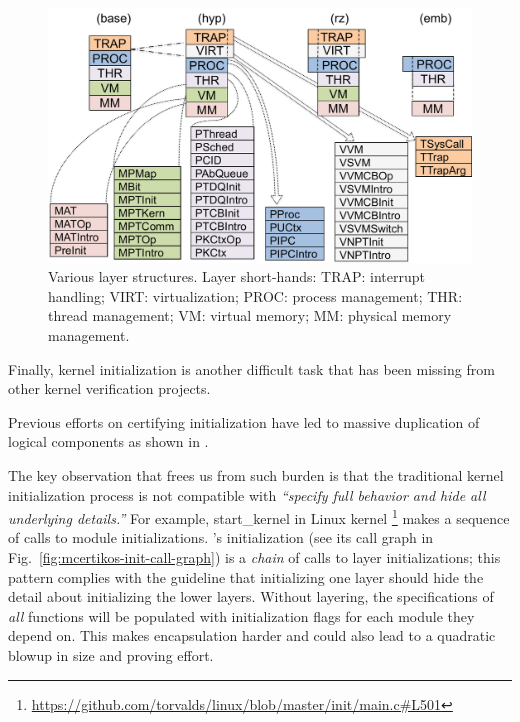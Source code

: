 {\begin{figure}[t]
\centering
\includegraphics[scale=0.5]{figs/layers2} 
\caption{Various \mCTOS{} layer structures.
Layer short-hands: TRAP: interrupt handling; VIRT: virtualization;
PROC: process management; THR: thread management;
VM: virtual memory; MM: physical memory management.}
\label{fig:kernel-layers}
\hrulefill
\end{figure}

Finally, kernel initialization is another difficult task
that has been missing from other kernel verification projects.

Previous efforts on certifying initialization have led to massive duplication
of logical components as shown in \cite{vaynberg12}.

The key observation that frees us from such burden is that the traditional
kernel initialization process is not compatible with
\emph{``specify full behavior and hide all underlying details.''}
For example, \textsf{start\_kernel} in Linux
kernel \footnote{\url{https://github.com/torvalds/linux/blob/master/init/main.c\#L501}}
makes a sequence of calls to module initializations.  \mCTOSbase's
initialization (see its call graph in
Fig.\ \ref{fig:mcertikos-init-call-graph}) is a \emph{chain} of calls
to layer initializations; this pattern complies with the guideline that 
initializing one layer should
hide the detail about initializing the lower layers.
Without layering, the specifications of \emph{all} functions will be populated
with initialization flags for each module they depend on. This
makes encapsulation harder and could also lead to
a quadratic blowup in size and proving effort.

}
